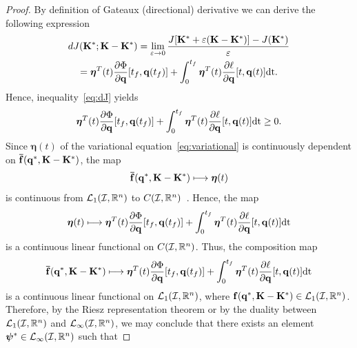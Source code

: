 \documentclass[
12pt,draftcls,onecolumn%
]{IEEEtran}
\begin{document}
\begin{proof}
By definition of Gateaux (directional) derivative we can derive the following expression
\begin{multline*}
dJ({\bf K}^*;{\bf K}-{\bf K}^*) =\lim_{\varepsilon\to 0}\frac{J[{\bf K}^*+\varepsilon({\bf K}-{\bf K}^*)] - J({\bf K}^*)}{\varepsilon}\\
=\boldsymbol{\eta}^T(t)\frac{\partial\Phi}{\partial{\bf q}}[t_f,{\bf q}(t_f)] + \int_{0}^{t_f}\boldsymbol{\eta}^T(t)\frac{\partial\ell}{\partial{\bf q}} [t,{\bf q}(t)]\mathrm{dt}.
\end{multline*}
Hence, inequality~\eqref{eq:dJ} yields
\begin{equation}
\boldsymbol{\eta}^T(t)\frac{\partial\Phi}{\partial{\bf q}}[t_f,{\bf q}(t_f)] + \int_{0}^{t_f}\boldsymbol{\eta}^T(t) \frac{\partial\ell}{\partial{\bf q}} [t,{\bf q}(t)]\mathrm{dt} \geq 0.
\label{eq:ineq1}
\end{equation}  
%
Since $\boldsymbol{\eta}(t)$ of the variational equation~\eqref{eq:variational} is continuously dependent on ${\bf \bar f}({\bf q}^*,{\bf K}-{\bf K}^*)$, the map
\begin{equation*}
{\bf \bar f}({\bf q}^*,{\bf K}-{\bf K}^*) \longmapsto \boldsymbol{\eta}(t)
\end{equation*}
is continuous from ${\cal L}_1({\cal I},\mathbb{R}^n)$ to $C({\cal I},\mathbb{R}^n)$~\cite[p.~260]{Ahmed2006}. Hence, the map 
\begin{equation*}
\boldsymbol{\eta}(t) \longmapsto \boldsymbol{\eta}^T(t)\frac{\partial\Phi}{\partial{\bf q}}[t_f,{\bf q}(t_f)] + \int_{0}^{t_f}\boldsymbol{\eta}^T(t)\frac{\partial\ell}{\partial{\bf q}} [t,{\bf q}(t)]\mathrm{dt}
\end{equation*}
is a continuous linear functional on $C({\cal I},\mathbb{R}^n)$. Thus, the composition map 
\begin{equation*}
{\bf \bar f}({\bf q}^*,{\bf K}-{\bf K}^*) \longmapsto \boldsymbol{\eta}^T(t)\frac{\partial\Phi}{\partial{\bf q}}[t_f,{\bf q}(t_f)] +\int_{0}^{t_f}\boldsymbol{\eta}^T(t) \frac{\partial\ell}{\partial{\bf q}} [t,{\bf q}(t)]\mathrm{dt}
\end{equation*}
is a continuous linear functional on ${\cal L}_1({\cal I},\mathbb{R}^n)$, where ${\bf f}({\bf q}^*,{\bf K}-{\bf K}^*)\in {\cal L}_1({\cal I},\mathbb{R}^n)$. Therefore, by the Riesz representation theorem or by the duality between ${\cal L}_1({\cal I},\mathbb{R}^n)$ and ${\cal L}_{\infty}({\cal I},\mathbb{R}^n)$, we may conclude that there exists an element $\boldsymbol{\psi}^*\in {\cal L}_{\infty}({\cal I},\mathbb{R}^n)$ such that

\end{proof}
\end{document}
